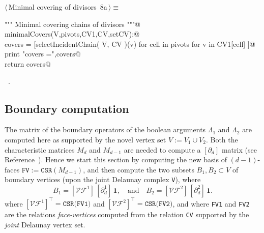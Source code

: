 \documentclass[11pt,oneside]{article}	%
\begin{document}
\begin{flushleft} \small \label{scrap14}
\protect{}$\langle\,$Minimal covering of divisors\nobreak\ {\footnotesize 8a}$\,\rangle\equiv$
\vspace{-1ex}
\begin{list}{}{} \item
\mbox{}\verb@""" Minimal covering chains of divisors """@\\
\mbox{}\verb@def minimalCovers(V,pivots,CV1,CV,setCV):@\\
\mbox{}\verb@   covers = [selectIncidentChain( V, CV )(v) for cell in pivots for v in CV1[cell] ]@\\
\mbox{}\verb@   print "\n covers =",covers@\\
\mbox{}\verb@   return covers@\\
\mbox{}\verb@@{\NWsep}
\end{list}
\vspace{-1ex}
\footnotesize\addtolength{\baselineskip}{-1ex}
\begin{list}{}{\setlength{\itemsep}{-\parsep}\setlength{\itemindent}{-\leftmargin}}
\item \NWtxtMacroRefIn\ .
\end{list}
\end{flushleft}




\subsection{Boundary computation}
The matrix of the boundary operators of the boolean arguments $\Lambda_1$ and $\Lambda_2$ are computed here as supported by the novel vertex set $V := V_1 \cup V_2$. Both the characteristic matrices $M_d$ and $M_{d-1}$ are needed to compute a $[\partial_d]$ matrix (see Reference~\cite{Dicarlo:2014:TNL:2543138.2543294}). Hence we start this section by computing the new basis of $(d-1)$-faces $\texttt{FV} := \texttt{CSR}(M_{d-1})$, and then compute the two subsets $B_1,B_2 \subset V$ of boundary vertices (upon the joint Delaunay complex \texttt{V}), where
\[
B_1 = [\mathcal{VF}^1]\, [\partial_d^1]\,\mathbf{1},
\quad\mbox{and}\quad
B_2 = [\mathcal{VF}^2]\, [\partial_d^2]\,\mathbf{1}.
\]
where $[\mathcal{VF}^1]^\top = \texttt{CSR(FV1)}$ and $[\mathcal{VF}^2]^\top = \texttt{CSR(FV2)}$,
and where \texttt{FV1} and \texttt{FV2} are the relations \emph{face-vertices} computed from the relation \texttt{CV} supported by the \emph{joint} Delaunay vertex set. 
\end{document}
